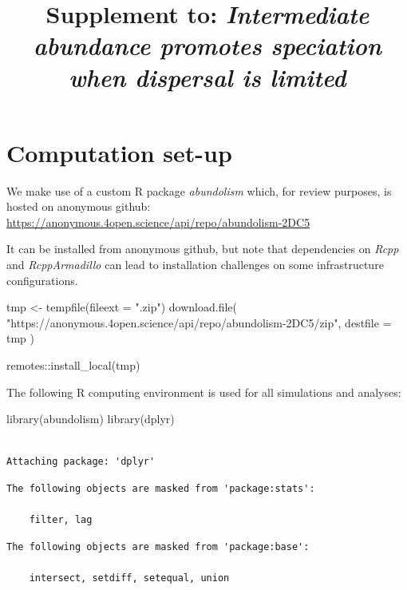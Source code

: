 \documentclass[
  letterpaper,
  DIV=11,
  numbers=noendperiod]{scrartcl}
\title{Supplement to: \emph{Intermediate abundance promotes speciation
when dispersal is limited}}
\author{}
\date{}
\newenvironment{Shaded}{\begin{snugshade}}{\end{snugshade}}
\newcommand{\AttributeTok}[1]{\textcolor[rgb]{0.40,0.45,0.13}{#1}}
\newcommand{\FunctionTok}[1]{\textcolor[rgb]{0.28,0.35,0.67}{#1}}
\newcommand{\NormalTok}[1]{\textcolor[rgb]{0.00,0.23,0.31}{#1}}
\newcommand{\OtherTok}[1]{\textcolor[rgb]{0.00,0.23,0.31}{#1}}
\newcommand{\SpecialCharTok}[1]{\textcolor[rgb]{0.37,0.37,0.37}{#1}}
\newcommand{\StringTok}[1]{\textcolor[rgb]{0.13,0.47,0.30}{#1}}
\begin{document}
\maketitle


\section{Computation set-up}\label{sec-setup}

We make use of a custom R package \emph{abundolism} which, for review
purposes, is hosted on anonymous github:
\url{https://anonymous.4open.science/api/repo/abundolism-2DC5}

It can be installed from anonymous github, but note that dependencies on
\emph{Rcpp} and \emph{RcppArmadillo} can lead to installation challenges
on some infrastructure configurations.

\begin{Shaded}
\begin{Highlighting}[]
\NormalTok{tmp }\OtherTok{\textless{}{-}} \FunctionTok{tempfile}\NormalTok{(}\AttributeTok{fileext =} \StringTok{".zip"}\NormalTok{)}
\FunctionTok{download.file}\NormalTok{(}
    \StringTok{"https://anonymous.4open.science/api/repo/abundolism{-}2DC5/zip"}\NormalTok{,}
    \AttributeTok{destfile =}\NormalTok{ tmp}
\NormalTok{)}

\NormalTok{remotes}\SpecialCharTok{::}\FunctionTok{install\_local}\NormalTok{(tmp)}
\end{Highlighting}
\end{Shaded}

The following R computing environment is used for all simulations and
analyses:

\begin{Shaded}
\begin{Highlighting}[]
\FunctionTok{library}\NormalTok{(abundolism)}
\FunctionTok{library}\NormalTok{(dplyr)}
\end{Highlighting}
\end{Shaded}

\begin{verbatim}

Attaching package: 'dplyr'
\end{verbatim}

\begin{verbatim}
The following objects are masked from 'package:stats':

    filter, lag
\end{verbatim}

\begin{verbatim}
The following objects are masked from 'package:base':

    intersect, setdiff, setequal, union
\end{verbatim}
\end{document}
